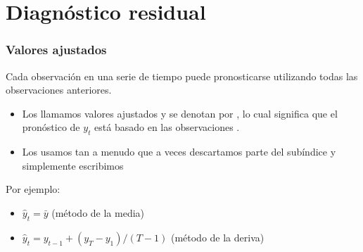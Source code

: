 \documentclass[10pt]{beamer}
\begin{document}



\section{Diagnóstico residual}
\begin{frame}
\frametitle{Valores ajustados}

Cada observación en una serie de tiempo puede pronosticarse utilizando todas las observaciones anteriores.

\vspace{4mm}

\begin{itemize}

\item Los llamamos valores ajustados y se denotan por , lo cual significa que el pronóstico de $y_t$ está basado en las observaciones .


\item Los usamos tan a menudo que a veces descartamos parte del subíndice y simplemente escribimos 

\end{itemize}


\begin{block}{Por ejemplo:}

\begin{itemize}
\item $\hat{y}_t = \bar{y}$ (método de la media)
\item $\hat{y}_t = y_{t-1} + (y_T - y_1)/(T-1)$ (método de la deriva)

\end{itemize}

\end{block}


\end{frame}


\end{document}
